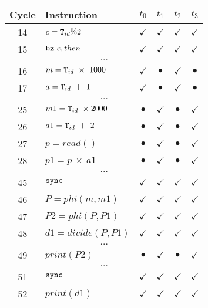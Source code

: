 \documentclass[times,10pt,twocolumn]{article}
\newcommand{\tid}{\mbox{\texttt{T}}_{id}}
\newcommand{\code}[1]{\mbox{\texttt{#1}}}
\begin{document}
\begin{figure}[htb]
\begin{center}
\caption{}
\label{code-b}


\begin{small}
\begin{tabular}{|c|l|c|c|c|c|} \hline
Cycle   & Instruction                  & $t_0$        & $t_1$        & $t_2$        & $t_3$        \\ \hline
14      & $ c = \tid \% 2$             & $\checkmark$ & $\checkmark$ & $\checkmark$ & $\checkmark$ \\ \hline
15      & $ \code{bz} \ c, then$ & $\checkmark$ & $\checkmark$ & $\checkmark$ & $\checkmark$ \\ \hline
\multicolumn{6}{c}{$\ldots$} \\ \hline
16      & $ m = \tid \ \times \ 1000$        & $\checkmark$    & $\bullet$ & $\checkmark$ & $\bullet$ \\ \hline
17      & $ a = \tid \ + \ 1$ & $\checkmark$    & $\bullet$ & $\checkmark$ & $\bullet$ \\ \hline
\multicolumn{6}{c}{$\ldots$} \\ \hline
25      & $ m1 = \tid \ \times 2000$ & $\bullet$    & $\checkmark$ & $\bullet$ & $\checkmark$ \\ \hline
26      & $ a1 = \tid \ + \ 2$        & $\bullet$    & $\checkmark$    & $\bullet$ & $\checkmark$ \\ \hline
27      & $ p = read()$ & $\bullet$    & $\checkmark$    & $\bullet$ & $\checkmark$ \\ \hline
28      & $ p1 = p \ \times \ a1$ & $\bullet$    & $\checkmark$    & $\bullet$ & $\checkmark$ \\ \hline
\multicolumn{6}{c}{$\ldots$} \\ \hline
45      & $ \code{sync}$        & $\checkmark$ & $\checkmark$ & $\checkmark$ & $\checkmark$ \\ \hline
46      & $ P = phi(m, m1)$    & $\checkmark$ & $\checkmark$ & $\checkmark$ & $\checkmark$ \\ \hline
47      & $ P2 = phi(P, P1)$ & $\checkmark$    & $\checkmark$ & $\checkmark$ & $\checkmark$ \\ \hline
48      & $ d1 = divide(P, P1)$ & $\checkmark$    & $\checkmark$ & $\checkmark$ & $\checkmark$ \\ \hline
\multicolumn{6}{c}{$\ldots$} \\ \hline
49      & $ print(P2)$ & $\bullet$    & $\checkmark$ & $\bullet$ & $\checkmark$ \\ \hline
\multicolumn{6}{c}{$\ldots$} \\ \hline
51      & $ \code{sync}$        & $\checkmark$ & $\checkmark$ & $\checkmark$ & $\checkmark$ \\ \hline
52      & $ print(d1)$ & $\checkmark$    & $\checkmark$ & $\checkmark$ & $\checkmark$ \\ \hline
\end{tabular}


\end{small}
\end{center}
\end{figure}
\end{document}
